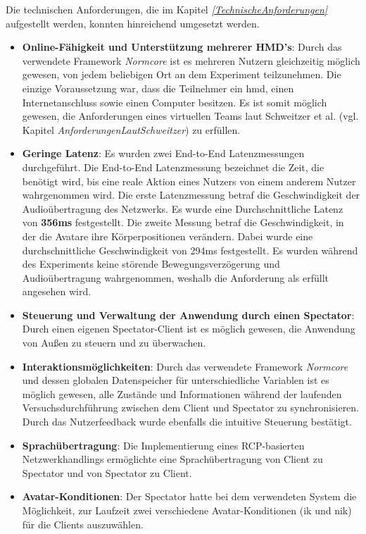 \documentclass[a4paper,11pt]{article}%
\renewcommand{\\}{\vspace*{0.5\baselineskip} \newline}
\begin{document}
Die technischen Anforderungen, die im Kapitel \textit{\ref{TechnischeAnforderungen}} aufgestellt werden, konnten hinreichend umgesetzt werden.
\begin{itemize}
\item \textbf{Online-Fähigkeit und Unterstützung mehrerer HMD's}: Durch das verwendete Framework \textit{Normcore} ist es mehreren Nutzern gleichzeitig möglich gewesen, von jedem beliebigen Ort an dem Experiment teilzunehmen. Die einzige Voraussetzung war, dass die Teilnehmer ein \ac{hmd}, einen Internetanschluss sowie einen Computer besitzen. Es ist somit möglich gewesen, die Anforderungen eines virtuellen Teams laut Schweitzer et al. \citep[S.270]{schweitzer2010conceptualizing} (vgl. Kapitel \textit{AnforderungenLautSchweitzer}) zu erfüllen. 
\item \textbf{Geringe Latenz}: Es wurden zwei End-to-End Latenzmessungen durchgeführt. Die End-to-End Latenzmessung bezeichnet die Zeit, die benötigt wird, bis eine reale Aktion eines Nutzers von einem anderem Nutzer wahrgenommen wird. Die erste Latenzmessung betraf die Geschwindigkeit der Audioübertragung des Netzwerks. Es wurde eine Durchschnittliche Latenz von \textbf{356ms} festgestellt.
Die zweite Messung betraf die Geschwindigkeit, in der die Avatare ihre Körperpositionen verändern. Dabei wurde eine durchschnittliche Geschwindigkeit von 294ms festgestellt.
Es wurden während des Experiments keine störende Bewegungsverzögerung und Audioübertragung wahrgenommen, weshalb die Anforderung als erfüllt angesehen wird.
\item \textbf{Steuerung und Verwaltung der Anwendung durch einen Spectator}: Durch einen eigenen Spectator-Client ist es möglich gewesen, die Anwendung von Außen zu steuern und zu überwachen.
\item \textbf{Interaktionsmöglichkeiten}:  Durch das verwendete Framework \textit{Normcore} und dessen globalen Datenspeicher für unterschiedliche Variablen ist es möglich gewesen, alle Zustände und Informationen während der laufenden Versuchsdurchführung zwischen dem Client und Spectator zu synchronisieren. Durch das Nutzerfeedback wurde ebenfalls die intuitive Steuerung bestätigt.
\item \textbf{Sprachübertragung}: Die Implementierung eines RCP-basierten Netzwerkhandlings ermöglichte eine Sprachübertragung von Client zu Spectator und von Spectator zu Client.
\item \textbf{Avatar-Konditionen}: Der Spectator hatte bei dem verwendeten System die Möglichkeit, zur Laufzeit zwei verschiedene Avatar-Konditionen (\ac{ik} und \ac{nik}) für die Clients auszuwählen.
\end{itemize}
\end{document}
